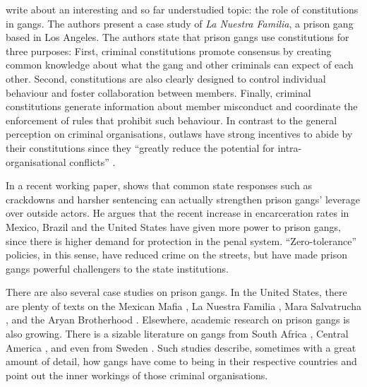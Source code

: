 \citet{leeson2010criminal} write about an interesting and so far understudied topic: the role of constitutions in gangs. The authors present a case study of \textit{La Nuestra Familia}, a prison gang based in Los Angeles. The authors state that prison gangs use constitutions for three purposes: First, criminal constitutions promote consensus by creating common knowledge about what the gang and other criminals can expect of each other. Second, constitutions are also clearly designed to control individual behaviour and foster collaboration between members. Finally, criminal constitutions generate information about member misconduct and coordinate the enforcement of rules that prohibit such behaviour. In contrast to the general perception on criminal organisations, outlaws have strong incentives to abide by their constitutions since they ``greatly reduce the potential for intra-organisational conflicts'' \citep[282]{leeson2010criminal}.

In a recent working paper, \citet{lessing2014cddrl} shows that common state responses such as crackdowns and harsher sentencing can actually strengthen prison gangs' leverage over outside actors. He argues that the recent increase in encarceration rates in Mexico, Brazil and the United States have given more power to prison gangs, since there is higher demand for protection in the penal system. ``Zero-tolerance'' policies, in this sense, have reduced crime on the streets, but have made prison gangs powerful challengers to the state institutions. 

There are also several case studies on prison gangs. In the United States, there are plenty of texts on the Mexican Mafia \citep{blatchford2008black, maguire1999policing, morrill2005mexican, rafael2013mexican}, La Nuestra Familia \citep{hunt1993changes, koehler2000organizational, lewis1980social}, Mara Salvatrucha \citep{etter2010mara, fogelbach2005mara, grascia2004gang, o2010reckless, wolf2012mara}, and the Aryan Brotherhood \citep{pelz1991right, price2005murder}. Elsewhere, academic research on prison gangs is also growing. There is a sizable literature on gangs from South Africa \citep{dissel2002reform, houston1998prison, lotter1988prison}, Central America \citep{bruneau2011maras, miguel2010central, sullivan2008transnational}, and even from Sweden \citep{larsson2011svensk}. Such studies describe, sometimes with a great amount of detail, how gangs have come to being in their respective countries and point out the inner workings of those criminal organisations. 

